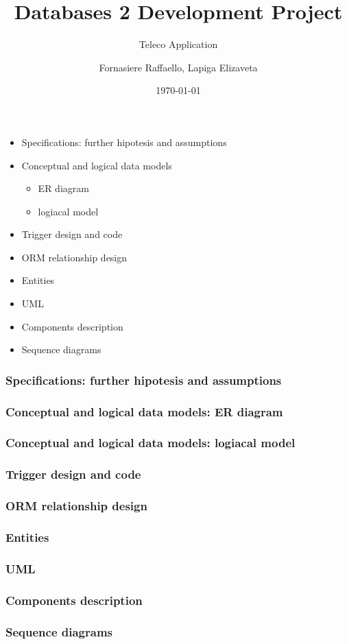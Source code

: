 \documentclass{beamer}
\title{Databases 2 Development Project}
\subtitle{Teleco Application}
\author{Fornasiere Raffaello, Lapiga Elizaveta}
\date{\today}
\begin{document}
\begin{frame}
    \maketitle
\end{frame}

\begin{frame}
    \begin{itemize}
        \item Specifications: further hipotesis and assumptions
        \item Conceptual and logical data models
            \begin{itemize}
                \item ER diagram
                \item logiacal model
            \end{itemize}
        \item Trigger design and code
        \item ORM relationship design
        \item Entities
        \item UML
        \item Components description
        \item Sequence diagrams
    \end{itemize}
\end{frame}

\begin{frame}
    \frametitle{Specifications: further hipotesis and assumptions}

\end{frame}

\begin{frame}
    \frametitle{Conceptual and logical data models: ER diagram}
\end{frame}

\begin{frame}
    \frametitle{Conceptual and logical data models: logiacal model}
\end{frame}

\begin{frame}
    \frametitle{Trigger design and code}
\end{frame}

\begin{frame}
    \frametitle{ORM relationship design}
\end{frame}

\begin{frame}
    \frametitle{Entities}
\end{frame}

\begin{frame}
    \frametitle{UML}
\end{frame}

\begin{frame}
    \frametitle{Components description}
\end{frame}

\begin{frame}
    \frametitle{Sequence diagrams}
\end{frame}
\end{document}
